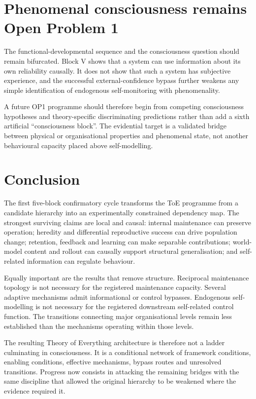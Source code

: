 \documentclass[11pt,a4paper]{article}
\begin{document}
\section{Phenomenal consciousness remains Open Problem 1}

The functional-developmental sequence and the consciousness question should remain bifurcated. Block V shows that a system can use information about its own reliability causally. It does not show that such a system has subjective experience, and the successful external-confidence bypass further weakens any simple identification of endogenous self-monitoring with phenomenality.

A future OP1 programme should therefore begin from competing consciousness hypotheses and theory-specific discriminating predictions rather than add a sixth artificial ``consciousness block''. The evidential target is a validated bridge between physical or organisational properties and phenomenal state, not another behavioural capacity placed above self-modelling.

\section{Conclusion}

The first five-block confirmatory cycle transforms the ToE programme from a candidate hierarchy into an experimentally constrained dependency map. The strongest surviving claims are local and causal: internal maintenance can preserve operation; heredity and differential reproductive success can drive population change; retention, feedback and learning can make separable contributions; world-model content and rollout can causally support structural generalisation; and self-related information can regulate behaviour.

Equally important are the results that remove structure. Reciprocal maintenance topology is not necessary for the registered maintenance capacity. Several adaptive mechanisms admit informational or control bypasses. Endogenous self-modelling is not necessary for the registered downstream self-related control function. The transitions connecting major organisational levels remain less established than the mechanisms operating within those levels.

The resulting Theory of Everything architecture is therefore not a ladder culminating in consciousness. It is a conditional network of framework conditions, enabling conditions, effective mechanisms, bypass routes and unresolved transitions. Progress now consists in attacking the remaining bridges with the same discipline that allowed the original hierarchy to be weakened where the evidence required it.
\end{document}
